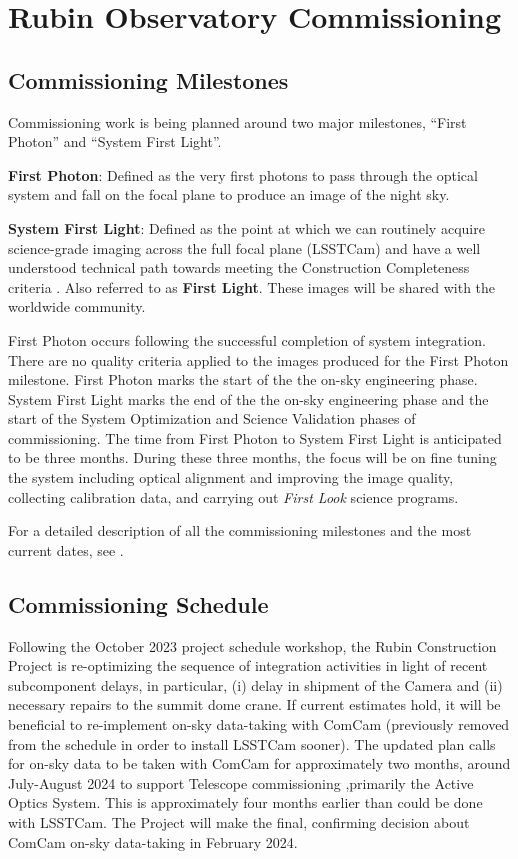 \section{Rubin Observatory Commissioning}
\label{sec:commissioning}

\subsection{Commissioning Milestones}
\label{ssec:commissioning-milestones}

Commissioning work is being planned around two major milestones, ``First Photon'' and ``System First Light''. 

\textbf {First Photon}: Defined as the very first photons to pass through the optical system and fall on the  focal plane to produce an image of the night sky.

\textbf {System First Light}: Defined as the point at which we can routinely acquire science-grade imaging across the full focal plane (LSSTCam) and have a well understood technical path towards meeting the Construction Completeness criteria   .
Also referred to as \textbf{First Light}. 
These images will be shared with the worldwide community. 

First Photon occurs following the successful completion of system integration. 
There are no quality criteria applied to the images produced for the First Photon milestone. 
First Photon  marks the start of the the on-sky engineering phase.
System First Light  marks the end of the the on-sky engineering phase and the start of the System Optimization and Science Validation phases of commissioning.
The time from First Photon to System First Light is anticipated to be three months.
During these three months, the focus will be on fine tuning the system including optical alignment and improving the image quality, collecting calibration data, and carrying out \textit{First Look} science programs. 

For a detailed description of all the commissioning milestones and the most current dates, see .

\subsection{Commissioning Schedule}
\label{ssec:commissioning-schedule}

Following the October 2023 project schedule workshop, the Rubin Construction Project is re-optimizing the sequence of integration activities in light of recent subcomponent delays, in particular, (i) delay in shipment of the Camera and (ii) necessary repairs to the  summit dome crane.
If current estimates hold, it will be beneficial to re-implement on-sky data-taking with ComCam (previously removed from the schedule in order to install LSSTCam sooner).
The updated plan calls for on-sky data to be taken with ComCam for approximately two months, around July-August 2024 to support Telescope commissioning ,primarily the Active Optics System. 
This is approximately four months earlier than could be done with LSSTCam. 
The Project will make the final, confirming decision about ComCam on-sky data-taking in February 2024.

